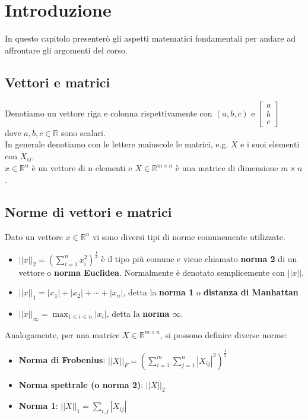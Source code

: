 \documentclass{../main.tex}[subfiles]
\begin{document}
\chapter{Introduzione}
In questo capitolo presenterò gli aspetti matematici fondamentali per andare ad affrontare gli argomenti del corso.
\\
\section{Vettori e matrici}
Denotiamo un vettore riga e colonna rispettivamente con $(a,b,c)$ e $ \begin{bmatrix} a \\ b \\ c \end{bmatrix} $
\\dove $a,b,c\in\mathbb{R}$ sono scalari.
\\
In generale denotiamo con le lettere maiuscole le matrici, e.g. $X$ e i suoi elementi con $X_{ij}$.\\
$x\in \mathbb{R}^n$ è un vettore di n elementi e $X \in \mathbb{R}^{m \times n}$ è una matrice di dimensione $m \times n$.
\section{Norme di vettori e matrici}
Dato un vettore $x\in \mathbb{R}^n$ vi sono diversi tipi di norme comunemente utilizzate.
\begin{itemize}
	\item $||x||_2=(\sum_{i=1}^n x_i^2)^{\frac{1}{2}}$
	è il tipo più comune e viene chiamato \textbf{norma 2} di un vettore o \textbf{norma Euclidea}. Normalmente è denotato semplicemente con $||x||$.
	\item $||x||_1=|x_1|+|x_2|+\cdots+|x_n|$, detta la \textbf{norma 1} o \textbf{distanza di Manhattan}
	\item $||x||_\infty=\max_{1\leq i\leq n}|x_i|$, detta la \textbf{norma $\infty$}.
\end{itemize}
Analogamente, per una matrice $X \in \mathbb{R}^{m \times n}$, si possono definire diverse norme:

\begin{itemize}
	\item \textbf{Norma di Frobenius}: $||X||_F = \left( \sum_{i=1}^m \sum_{j=1}^n |X_{ij}|^2 \right)^{\frac{1}{2}}$
	\item \textbf{Norma spettrale (o norma 2)}: $||X||_2$
	\item \textbf{Norma 1}: $||X||_1=\sum_{i,j} |X_{ij}|$
\end{itemize}
\end{document}

